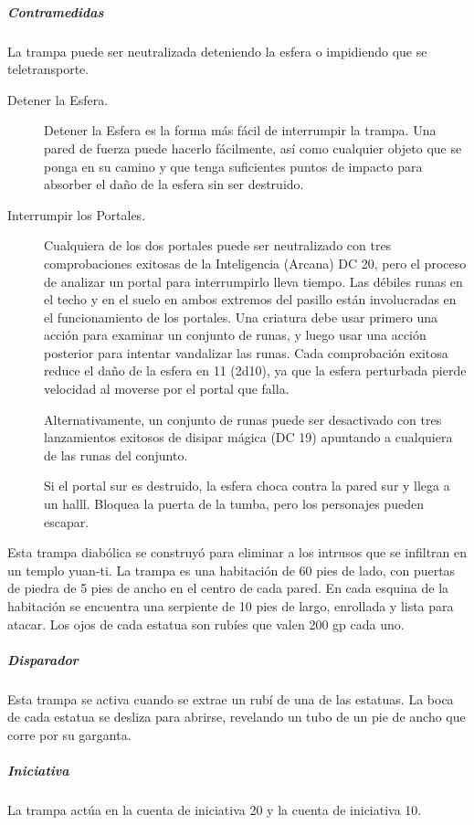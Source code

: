 \documentclass[a4paper,twocolumn,openany,10pt]{dndbook}
\begin{document}
\subparagraph{Contramedidas} La trampa puede ser neutralizada deteniendo la esfera o impidiendo que se teletransporte. 

\begin{description}
	\item[Detener la Esfera.] Detener la Esfera es la forma más fácil de interrumpir la trampa. Una pared de fuerza puede hacerlo
	fácilmente, así como cualquier objeto que se ponga en su camino y que tenga suficientes puntos de impacto para absorber el
	daño de la esfera sin ser destruido.

	\item[Interrumpir los Portales.] Cualquiera de los dos portales puede ser neutralizado con tres comprobaciones exitosas de la
	Inteligencia (Arcana) DC 20, pero el proceso de analizar un portal para interrumpirlo lleva tiempo. Las débiles runas en el
	techo y en el suelo en ambos extremos del pasillo están involucradas en el funcionamiento de los portales. Una criatura debe
	usar primero una acción para examinar un conjunto de runas, y luego usar una acción posterior para intentar vandalizar las
	runas. Cada comprobación exitosa reduce el daño de la esfera en 11 (2d10), ya que la esfera perturbada pierde velocidad al
	moverse por el portal que falla.

	Alternativamente, un conjunto de runas puede ser desactivado con tres lanzamientos exitosos de disipar mágica (DC 19)
	apuntando a cualquiera de las runas del conjunto.

	Si el portal sur es destruido, la esfera choca contra la pared sur y llega a un halll. Bloquea la puerta de la tumba, pero
	los personajes pueden escapar. 
\end{description}

Esta trampa diabólica se construyó para eliminar a los intrusos que se infiltran en un templo yuan-ti. La trampa es una
habitación de 60 pies de lado, con puertas de piedra de 5 pies de ancho en el centro de cada pared. En cada esquina de la
habitación se encuentra una serpiente de 10 pies de largo, enrollada y lista para atacar. Los ojos de cada estatua son rubíes que
valen 200 gp cada uno.

\subparagraph{Disparador} Esta trampa se activa cuando se extrae un rubí de una de las estatuas. La boca de cada estatua se
desliza para abrirse, revelando un tubo de un pie de ancho que corre por su garganta. 

\subparagraph{Iniciativa} La trampa actúa en la cuenta de iniciativa 20 y la cuenta de iniciativa 10.
\end{document}
